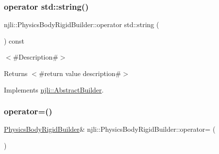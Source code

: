 \subsubsection{\texorpdfstring{operator std\+::string()}{operator std::string()}}
{\footnotesize\ttfamily njli\+::\+Physics\+Body\+Rigid\+Builder\+::operator std\+::string (\begin{DoxyParamCaption}{ }\end{DoxyParamCaption}) const\hspace{0.3cm}{\ttfamily [virtual]}}

$<$\#\+Description\#$>$

\begin{DoxyReturn}{Returns}
$<$\#return value description\#$>$ 
\end{DoxyReturn}


Implements \mbox{\hyperlink{classnjli_1_1_abstract_builder_a3e6e553e06d1ca30517ad5fb0bd4d000}{njli\+::\+Abstract\+Builder}}.

\mbox{\label{classnjli_1_1_physics_body_rigid_builder_ab2a0a2ac51dad17b770f616f369feb6d}} 
\subsubsection{\texorpdfstring{operator=()}{operator=()}}
{\footnotesize\ttfamily \mbox{\hyperlink{classnjli_1_1_physics_body_rigid_builder}{Physics\+Body\+Rigid\+Builder}}\& njli\+::\+Physics\+Body\+Rigid\+Builder\+::operator= (\begin{DoxyParamCaption}\item[{const \mbox{\hyperlink{classnjli_1_1_physics_body_rigid_builder}{Physics\+Body\+Rigid\+Builder}} \&}]{ }\end{DoxyParamCaption})\hspace{0.3cm}{\ttfamily [protected]}}

\mbox{\label{classnjli_1_1_physics_body_rigid_builder_a9be25c248667548488588746cd37f529}} 
